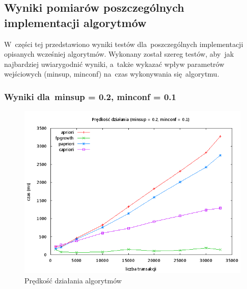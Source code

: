 \subsection{Wyniki pomiarów poszczególnych implementacji algorytmów}

W~części tej przedstawiono wyniki testów dla~poszczególnych implementacji opisanych wcześniej algorytmów. Wykonany został szereg testów, aby~jak najbardziej uwiarygodnić wyniki, a~także wykazać wpływ parametrów wejściowych (minsup, minconf) na~czas wykonywania się~algorytmu.


\subsubsection{Wyniki dla~minsup = 0.2, minconf = 0.1}

\begin{figure}[H]
\centering
\includegraphics[width=1.1\textwidth]{figures/06/02_01.png}
\caption{Prędkość działania algorytmów\label{rys:02_01}}
\end{figure}

